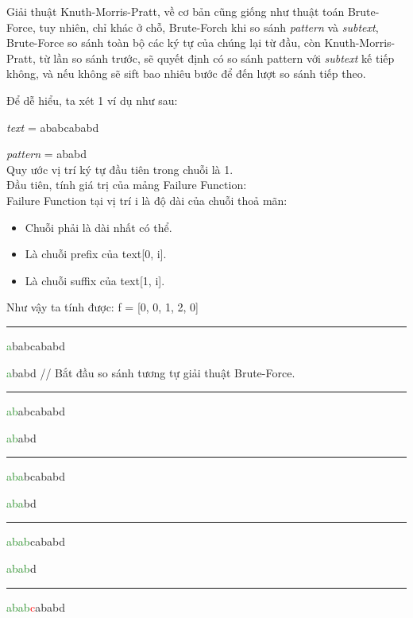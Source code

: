 \documentclass[a4paper,11pt]{article}
\begin{document}
			Giải thuật Knuth-Morris-Pratt, về cơ bản cũng giống như thuật toán Brute-Force, 
			tuy nhiên, chỉ khác ở chỗ, Brute-Forch khi so sánh \textit{pattern} và \textit{subtext}, Brute-Force so sánh toàn bộ 
			các ký tự của chúng lại từ đầu, còn Knuth-Morris-Pratt, từ lần so sánh trước, sẽ quyết định có so sánh pattern với \textit{subtext} kế tiếp không, 
			và nếu không sẽ sift bao nhiêu bước để đến lượt so sánh tiếp theo.

			Để dễ hiểu, ta xét 1 ví dụ như sau: 
			
			\textit{text} \hspace*{6mm}= ababcababd

			\textit{pattern} \hspace*{0.3mm}= ababd\\
			Quy ước vị trí ký tự đầu tiên trong chuỗi là 1.\\
			Đầu tiên, tính giá trị của mảng Failure Function:\\
			Failure Function tại vị trí i là độ dài của chuỗi thoả mãn:
			\begin{itemize}
				\item Chuỗi phải là dài nhất có thể.
				\item Là chuỗi prefix của text[0, i].
				\item Là chuỗi suffix của text[1, i].
			\end{itemize}
			Như vậy ta tính được: 
			f = [0, 0, 1, 2, 0]
			
			\vspace*{4mm}
			\hrule
			\textcolor{ForestGreen}{a}babcababd
			
			\textcolor{ForestGreen}{a}babd \hspace*{1.8cm} // Bắt đầu so sánh tương tự giải thuật Brute-Force.

			\vspace*{2mm}
			\hrule
			\textcolor{ForestGreen}{ab}abcababd
			
			\textcolor{ForestGreen}{ab}abd
			
			\vspace*{2mm}
			\hrule
			\textcolor{ForestGreen}{aba}bcababd
			
			\textcolor{ForestGreen}{aba}bd

			\vspace*{2mm}
			\hrule
			\textcolor{ForestGreen}{abab}cababd
			
			\textcolor{ForestGreen}{abab}d

			\vspace*{2mm}
			\hrule
			\textcolor{ForestGreen}{abab}\textcolor{red}{c}ababd
			
\end{document}
